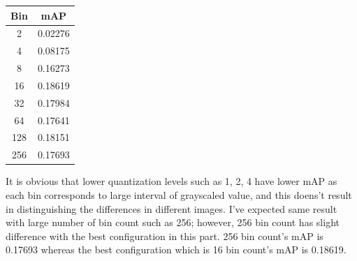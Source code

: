 \documentclass[12pt]{article}
\begin{document}
\begin{minipage}{\textwidth}
	\begin{minipage}{0.49\textwidth}
		\centering
		\captionsetup{width=.9\textwidth}
	 \end{minipage}
	 \hfill
	\begin{minipage}{0.49\textwidth}
		\centering
		\begin{tabular}{ | c | c | }
		  \hline			
		  \bf Bin & \bf mAP \\
		  \hline		
		  2 & 0.02276 \\
		  \hline	
		  4 & 0.08175 \\
		  \hline	
		  8 & 0.16273 \\
		  \hline	
		  16 & 0.18619 \\
		  \hline	
		  32 & 0.17984 \\
		  \hline	
		  64 & 0.17641 \\
		  \hline	
		  128 & 0.18151 \\
		  \hline	
		  256 & 0.17693 \\
		  \hline
		\end{tabular}
		\captionsetup{width=.8\textwidth}
	\end{minipage}
\end{minipage}

It is obvious that lower quantization levels such as 1, 2, 4 have lower mAP as each bin corresponds to large interval of grayscaled value, and this doens't result in distinguishing the differences in different images. I've expected same result with large number of bin count such as 256; however, 256 bin count has slight difference with the best configuration in this part. 256 bin count's mAP is 0.17693 whereas the best configuration which is 16 bin count's mAP is 0.18619.
\end{document}
